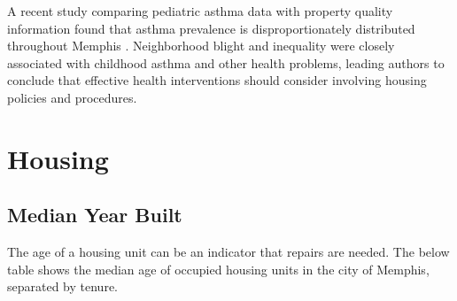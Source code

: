 \documentclass[
]{book}
\begin{document}
A recent study comparing pediatric asthma data with property quality information found that asthma prevalence is disproportionately distributed throughout Memphis \citep{shin2018}. Neighborhood blight and inequality were closely associated with childhood asthma and other health problems, leading authors to conclude that effective health interventions should consider involving housing policies and procedures.

\hypertarget{housing}{%
\section{Housing}\label{housing}}

\hypertarget{median-year-built}{%
\subsection{Median Year Built}\label{median-year-built}}

The age of a housing unit can be an indicator that repairs are needed. The below table shows the median age of occupied housing units in the city of Memphis, separated by tenure.
\end{document}

